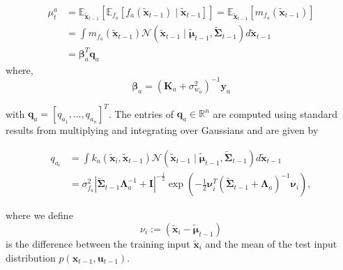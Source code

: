 \begin{equation}\label{eq:mu}
\begin{aligned}
\mu_t^a & =\mathbb{E}_{\tilde{\boldsymbol{x}}_{t-1}}\left[\mathbb{E}_{f_a}\left[f_a\left(\tilde{\boldsymbol{x}}_{t-1}\right) \mid \tilde{\boldsymbol{x}}_{t-1}\right]\right]=\mathbb{E}_{\tilde{\boldsymbol{x}}_{t-1}}\left[m_{f_a}\left(\tilde{\boldsymbol{x}}_{t-1}\right)\right] \\
& =\int m_{f_a}\left(\tilde{\boldsymbol{x}}_{t-1}\right) \mathcal{N}\left(\tilde{\boldsymbol{x}}_{t-1} \mid \tilde{\boldsymbol{\mu}}_{t-1}, \tilde{\boldsymbol{\Sigma}}_{t-1}\right) d \tilde{\boldsymbol{x}}_{t-1} \\
& =\boldsymbol{\beta}_a^T \boldsymbol{q}_a 
\end{aligned}
\end{equation}
where,
\begin{equation}\label{eq:beta}
    \boldsymbol{\beta}_a =\left(\boldsymbol{K}_a+\sigma_{w_a}^2\right)^{-1} \boldsymbol{y}_a
\end{equation}

with $\boldsymbol{q}_a=\left[q_{a_1}, \ldots, q_{a_n}\right]^T$. The entries of $\boldsymbol{q}_a \in \mathbb{R}^n$ are computed using standard results from multiplying and integrating over Gaussians and are given by

\begin{equation}\label{eq:mu_qa}
\begin{aligned}
q_{a_i} & =\int k_a\left(\tilde{\boldsymbol{x}}_i, \tilde{\boldsymbol{x}}_{t-1}\right) \mathcal{N}\left(\tilde{\boldsymbol{x}}_{t-1} \mid \tilde{\boldsymbol{\mu}}_{t-1}, \tilde{\boldsymbol{\Sigma}}_{t-1}\right) d \tilde{\boldsymbol{x}}_{t-1} \\
& =\sigma_{f_a}^2\left|\tilde{\boldsymbol{\Sigma}}_{t-1} \boldsymbol{\Lambda}_a^{-1}+\boldsymbol{I}\right|^{-\frac{1}{2}} \exp \left(-\frac{1}{2} \boldsymbol{\nu}_i^T\left(\tilde{\boldsymbol{\Sigma}}_{t-1}+\boldsymbol{\Lambda}_a\right)^{-1} \boldsymbol{\nu}_i\right),
\end{aligned}
\end{equation}

where we define
\begin{equation}\label{eq:difference_vi}
    \nu_i:=\left(\tilde{\boldsymbol{x}}_i-\tilde{\boldsymbol{\mu}}_{t-1}\right)
\end{equation}
is the difference between the training input $\tilde{\boldsymbol{x}}_i$ and the mean of the test input distribution $p\left(\boldsymbol{x}_{t-1}, \boldsymbol{u}_{t-1}\right)$.

